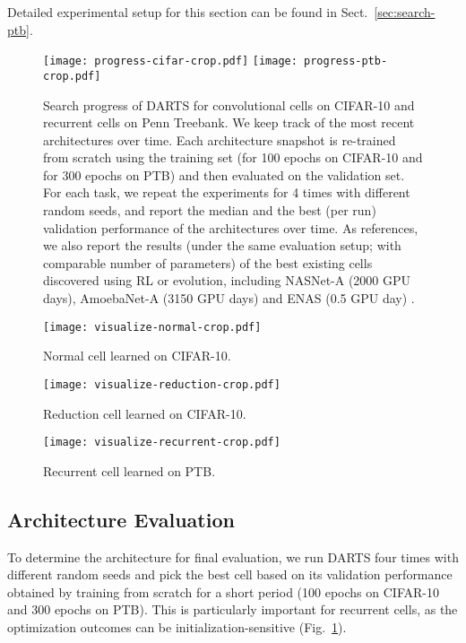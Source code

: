 \documentclass{article}
\begin{document}
Detailed experimental setup for this section can be found in Sect.~\ref{sec:search-ptb}.

\begin{figure}
	\centering
	\texttt{[image: progress-cifar-crop.pdf]}
	\hfill
	\texttt{[image: progress-ptb-crop.pdf]}
	\caption{Search progress of DARTS for convolutional cells on CIFAR-10 and recurrent cells on Penn Treebank.
	We keep track of the most recent architectures over time. Each architecture snapshot is re-trained from scratch using the training set (for 100 epochs on CIFAR-10 and for 300 epochs on PTB) and then evaluated on the validation set. For each task, we repeat the experiments for 4 times with different random seeds, and report the median and the best (per run) validation performance of the architectures over time. As references, we also report the results (under the same evaluation setup; with comparable number of parameters) of the best existing cells discovered using RL or evolution, including NASNet-A \citep{zoph2017learning} (2000 GPU days), AmoebaNet-A (3150 GPU days) \citep{real2018regularized} and ENAS (0.5 GPU day) \citep{pham2018efficient}.
	}
	\label{fig:progress}
\end{figure}

\begin{figure}[ht]
\hfill
\begin{minipage}[c]{0.5\linewidth}
\centering
\texttt{[image: visualize-normal-crop.pdf]}
\caption{Normal cell learned on CIFAR-10.}
\vspace{1em}
\texttt{[image: visualize-reduction-crop.pdf]}
\caption{Reduction cell learned on CIFAR-10.}
\label{fig:visualization-convolutional}
\end{minipage}
\begin{minipage}[c]{0.48\linewidth}
\centering
\texttt{[image: visualize-recurrent-crop.pdf]}
\caption{Recurrent cell learned on PTB.}
\label{fig:visualization-recurrent}
\end{minipage}
\hfill
\end{figure}

\subsection{Architecture Evaluation}
\label{sec:sec:experiment-eval}
To determine the architecture for final evaluation,
we run DARTS four times with different random seeds and pick the best cell based on its validation performance obtained by training from scratch for a short period (100 epochs on CIFAR-10 and 300 epochs on PTB).
This is particularly important for recurrent cells,
as the optimization outcomes can be initialization-sensitive (Fig.~\ref{fig:progress}).
\end{document}
